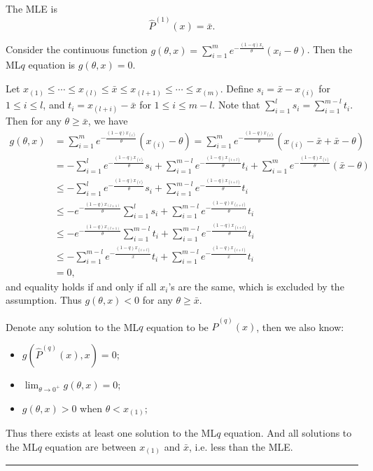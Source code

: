 \documentclass[a4paper]{article}
\newenvironment{proof}{{\bf Proof:  }}{\hfill\rule{2mm}{2mm}}
\begin{document}
\begin{proof}
The MLE is
\[
	\hat{P}^{(1)}(x) = \bar{x}.
\]

Consider the continuous function $g(\theta, x) = \sum_{i=1}^m e^{-\frac{(1-q)x_i}{\theta}}(x_i - \theta)$. Then the ML$q$ equation is $g(\theta, x) = 0$.

Let $x_{(1)} \le \cdots \le x_{(l)} \le \bar{x} \le x_{(l+1)} \le \cdots \le x_{(m)}$. Define $s_i = \bar{x} - x_{(i)}$ for $1 \le i \le l$, and $t_{i} = x_{(l+i)} - \bar{x}$ for $1 \le i \le m - l$. Note that $\sum_{i=1}^l s_i = \sum_{i=1}^{m-l} t_i$. Then for any $\theta \ge \bar{x}$, we have
\begin{align*}
g(\theta, x) & = \sum_{i=1}^m e^{-\frac{(1-q)x_{(i)}}{\theta}}(x_{(i)} - \theta)
= \sum_{i=1}^m e^{-\frac{(1-q)x_{(i)}}{\theta}}(x_{(i)} - \bar{x} + \bar{x} - \theta) \\
& = - \sum_{i=1}^l e^{-\frac{(1-q)x_{(i)}}{\theta}}s_i
+ \sum_{i=1}^{m-l} e^{-\frac{(1-q)x_{(i+l)}}{\theta}}t_i
+ \sum_{i=1}^m e^{-\frac{(1-q)x_{(i)}}{\theta}}(\bar{x} - \theta)\\
& \le - \sum_{i=1}^l e^{-\frac{(1-q)x_{(i)}}{\theta}}s_i
+ \sum_{i=1}^{m-l} e^{-\frac{(1-q)x_{(i+l)}}{\theta}}t_i \\
& \le - e^{-\frac{(1-q)x_{(l+1)}}{\theta}} \sum_{i=1}^l s_i
+ \sum_{i=1}^{m-l} e^{-\frac{(1-q)x_{(i+l)}}{\theta}}t_i \\
& \le - e^{-\frac{(1-q)x_{(l+1)}}{\theta}} \sum_{i=1}^{m-l} t_i
+ \sum_{i=1}^{m-l} e^{-\frac{(1-q)x_{(i+l)}}{\theta}}t_i \\
& \le - \sum_{i=1}^{m-l} e^{-\frac{(1-q)x_{(i+l)}}{\bar{x}}}t_i
+ \sum_{i=1}^{m-l} e^{-\frac{(1-q)x_{(i+l)}}{\bar{x}}}t_i\\
& = 0,
\end{align*}
and equality holds if and only if all $x_i$'s are the same, which is excluded by the assumption.
Thus $g(\theta, x) < 0$ for any $\theta \ge \bar{x}$.

Denote any solution to the ML$q$ equation to be $\hat{P}^{(q)}(x)$, then we also know:
\begin{itemize}
\item $g(\hat{P}^{(q)}(x), x) = 0$;
\item $\lim_{\theta \rightarrow 0^+}g(\theta, x) = 0$;
\item $g(\theta, x) > 0$ when $\theta < x_{(1)}$;
\end{itemize}

Thus there exists at least one solution to the ML$q$ equation. And all solutions to the ML$q$ equation are between $x_{(1)}$ and $\bar{x}$, i.e. less than the MLE.
\end{proof}
\end{document}
